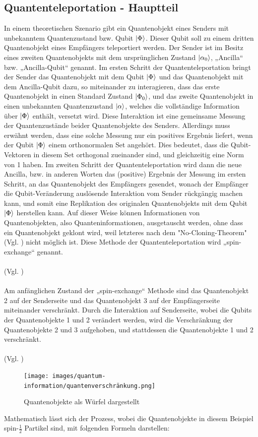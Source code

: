 \subsection{Quantenteleportation - Hauptteil}
In einem theoretischen Szenario gibt ein Quantenobjekt eines Senders mit unbekanntem Quantenzustand bzw. Qubit \(\ket{\Phi}\). Dieser Qubit soll zu einem dritten Quantenobjekt eines Empfängers teleportiert werden. Der Sender ist im Besitz eines zweiten Quantenobjekts mit dem ursprünglichen Zustand \(\ket{\alpha_0}\), „Ancilla“ bzw. „Ancilla-Qubit“ genannt. Im ersten Schritt der Quantenteleportation bringt der Sender das Quantenobjekt mit dem Qubit \(\ket{\Phi}\) und das Quantenobjekt mit dem Ancilla-Qubit dazu, so miteinander zu interagieren, dass das erste Quantenobjekt in einen Standard Zustand \(\ket{\Phi_0}\), und das zweite Quantenobjekt in einen unbekannten Quantenzustand \(\ket{\alpha}\), welches die vollständige Information über \(\ket{\Phi}\) enthält, versetzt wird. Diese Interaktion ist eine gemeinsame Messung der Quantenzustände beider Quantenobjekte des Senders. Allerdings muss erwähnt werden, dass eine solche Messung nur ein positives Ergebnis liefert, wenn der Qubit \(\ket{\Phi}\) einem orthonormalen Set angehört. Dies bedeutet, dass die Qubit-Vektoren in diesem Set orthogonal zueinander sind, und gleichzeitig eine Norm von 1 haben. Im zweiten Schritt der Quantenteleportation wird dann die neue Ancilla, bzw. in anderen Worten das (positive) Ergebnis der Messung im ersten Schritt, an das Quantenobjekt des Empfängers gesendet, wonach der Empfänger die Qubit-Veränderung auslösende Interaktion vom Sender rückgängig machen kann, und somit eine Replikation des originalen Quantenobjekts mit dem Qubit \(\ket{\Phi}\) herstellen kann. Auf dieser Weise können Informationen von Quantenobjekten, also Quanteninformationen, ausgetauscht werden, ohne dass ein Quantenobjekt geklont wird, weil letzteres nach dem "No-Cloning-Theorem" (Vgl. \cite[S.77]{gisin_unbegreifliche_2014}) nicht möglich ist. Diese Methode der Quantenteleportation wird „spin-exchange“ genannt.\\
\\
(Vgl. \cite[S.1-2]{bennett_teleporting_1993})\\
\\
Am anfänglichen Zustand der „spin-exchange“ Methode sind das Quantenobjekt 2 auf der Senderseite und das Quantenobjekt 3 auf der Empfängerseite miteinander verschränkt. Durch die Interaktion auf Senderseite, wobei die Qubits der Quantenobjekte 1 und 2 verändert werden, wird die Verschränkung der Quantenobjekte 2 und 3 aufgehoben, und stattdessen die Quantenobjekte 1 und 2 verschränkt.\\
\\
(Vgl. \cite[S.2-3]{bennett_teleporting_1993})\\
\begin{figure}[h!]
    \centering
    \texttt{[image: images/quantum-information/quantenverschränkung.png]}
    \caption{Quantenobjekte als Würfel dargestellt}
    \label{fig:meinbild}
\end{figure}
\newpage
\noindent Mathematisch lässt sich der Prozess, wobei die Quantenobjekte in diesem Beispiel spin-\(\frac{1}{2}\) Partikel sind, mit folgenden Formeln darstellen:

